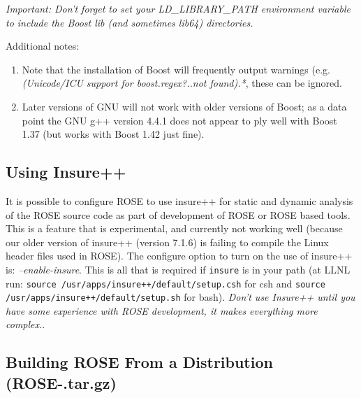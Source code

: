{\em Important: Don't forget to set your LD\_LIBRARY\_PATH environment variable to include
    the Boost lib (and sometimes lib64) directories.}

Additional notes:
\begin{enumerate}
     \item Note that the installation of Boost will frequently output 
           warnings (e.g. {\em *(Unicode/ICU support for boost.regex?..not found).*},
           these can be ignored.

     \item Later versions of GNU will not work with older versions of Boost; as a data
           point the GNU g++ version 4.4.1 does not appear to ply well with Boost 1.37 
           (but works with Boost 1.42 just fine).

\end{enumerate}

\subsection{Using Insure++}
\label{gettingStarted:insure}

   It is possible to configure ROSE to use insure++ for static and dynamic analysis
of the ROSE source code as part of development of ROSE or ROSE based tools.  This
is a feature that is experimental, and currently not working well (because our older
version of insure++ (version 7.1.6) is failing to compile the Linux header files used in ROSE).
The configure option to turn on the use of insure++ is: {\em --enable-insure}.
This is all that is required if {\tt insure} is in your path (at LLNL run: 
{\tt source /usr/apps/insure++/default/setup.csh} for csh and 
{\tt source /usr/apps/insure++/default/setup.sh} for bash).  
{\em Don't use Insure++ until you have some experience with ROSE development, it makes everything more complex.}.



\subsection{Building ROSE From a Distribution (ROSE-\VersionNumber.tar.gz)}
\label{gettingStarted:UserInstructions}

